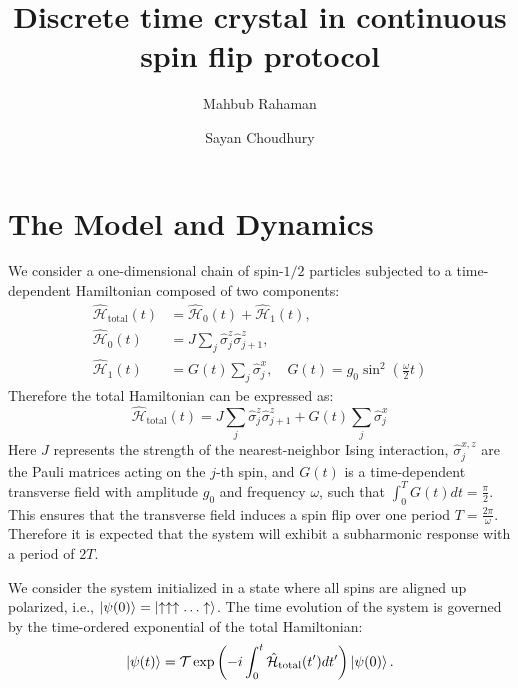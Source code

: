 \documentclass[a4paper, 10pt]{article}
\title{Discrete time crystal in continuous spin flip protocol}
\author[1]{Mahbub Rahaman}
\author[1]{Sayan Choudhury}
\affil[1]{\small Harish-Chandra Research Institute, HBNI, Chhatnag Road, Jhunsi, Praygraj, UP - 211019, India}
\date{}
\begin{document}
\maketitle

\section{The Model and Dynamics}
We consider a one-dimensional chain of spin-$1/2$ particles subjected to a time-dependent Hamiltonian composed of two components:
\begin{align}
    \hat{\mathcal{H}}_{\text{total}}(t) &=  \hat{\mathcal{H}}_0(t) + \hat{\mathcal{H}}_1(t)  , \\
    \hat{\mathcal{H}}_0(t) &= J\sum_{j} \hat{\sigma}_j^z \hat{\sigma}_{j+1}^z,  \\
    \hat{\mathcal{H}}_1(t) &= G(t)\sum_{j}\hat{\sigma}_j^x, \quad G(t) = g_0\sin^2\left(\frac{\omega}{2} t\right)
\end{align}
Therefore the total Hamiltonian can be expressed as:
\begin{equation}
    \boxed{
        \hat{\mathcal{H}}_{\text{total}}(t) =  J\sum_{j} \hat{\sigma}_j^z \hat{\sigma}_{j+1}^z + G(t)\sum_{j}\hat{\sigma}_j^x
    }
\end{equation}
Here $J$ represents the strength of the nearest-neighbor Ising interaction, $\hat{\sigma}_j^{x,z}$ are the Pauli matrices acting on the $j$-th spin, and $G(t)$ is a time-dependent transverse field with amplitude $g_0$ and frequency $\omega$, such that $\displaystyle \int_0^T G(t)dt = \frac{\pi}{2}$. This ensures that the transverse field induces a spin flip over one period $T = \frac{2\pi}{\omega}$. Therefore it is expected that the system will exhibit a subharmonic response with a period of $2T$.



We consider the system initialized in a state where all spins are aligned up polarized, i.e., $\ket{\psi(0)} = \ket{\uparrow\uparrow\uparrow\ldots\uparrow}$. The time evolution of the system is governed by the time-ordered exponential of the total Hamiltonian:
\begin{equation}
    \ket{\psi(t)} = \mathcal{T} \exp\left(-i\int_0^t \hat{\mathcal{H}}_{\text{total}}(t') dt'\right) \ket{\psi(0)}.
\end{equation}
\end{document}
